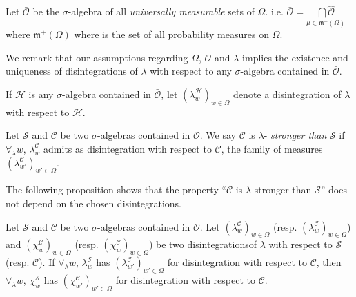 Let $\bar{\mathscr{O}}$ be the $\sigma$-algebra of all {\em
  universally measurable} sets of $\Omega$. i.e. $\bar{\mathscr{O}} =
\underset{\mu \in \mathfrak{m}^+(\Omega)}{\bigcap\limits
  \hat{\mathscr{O}}} $ where $\mathfrak{m}^+(\Omega)$ where is the set
of all probability measures on $\Omega$.

We remark that our assumptions regarding $\Omega$, $\mathscr{O}$ and
$\lambda$ implies the existence and uniqueness of disintegrations of
$\lambda$ with respect to any $\sigma$-algebra contained in
$\bar{\mathscr{O}}$.

If $\mathscr{H}$ is any $\sigma$-algebra contained in
$\bar{\mathscr{O}}$, let $(\lambda^\mathscr{H}_w)_{w \in \Omega}$
denote a disintegration of $\lambda$ with respect to $\mathscr{H}$. 

\begin{defn}\label{part2:chap7:def97}
Let $\mathscr{S}$ and $\mathscr{C}$ be two $\sigma$-algebras contained
in $\bar{\mathscr{O}}$. We say $\mathscr{C}$ is $\lambda$-{\em
  stronger than} $\mathscr{S}$ if $\forall_\lambda w$,
$\lambda^\mathscr{C}_w$ admits as disintegration with respect to
$\mathscr{C}$, the family of measures $(\lambda^\mathscr{C}_{w'})_{w'
  \in \Omega}$.

The following proposition shows that the property ``$\mathscr{C}$ is
$\lambda$-stronger than $\mathscr{S}$'' does not depend on the chosen
disintegrations. 
\end{defn}

\begin{proposition}\label{part2:chap7:prop98}
Let $\mathscr{S}$ and $\mathscr{C}$ be two $\sigma$-algebras contained
in $\bar{\mathscr{O}}$. Let $(\lambda^\mathscr{C}_w)_{w \in \Omega}$
(resp. $(\lambda^\mathscr{C}_w)_{w \in \Omega}$) and
$(\chi^\mathscr{C}_w)_{w \in \Omega}$ (resp. $(\chi^\mathscr{C}_w)_{w
  \in \Omega}$) be two disintegrations\pageoriginale of $\lambda$ with respect to
$\mathscr{S}$ (resp. $\mathscr{C}$). If $\forall_\lambda w$,
$\lambda^\mathscr{S}_w$ has $(\lambda^\mathscr{C}_{w'})_{w' \in
  \Omega}$ for disintegration with respect to $\mathscr{C}$, then
$\forall_\lambda w$, $\chi^\mathscr{S}_w$ has
$(\chi^\mathscr{C}_{w'})_{w' \in \Omega}$ for disintegration with
respect to $\mathscr{C}$. 
\end{proposition}


